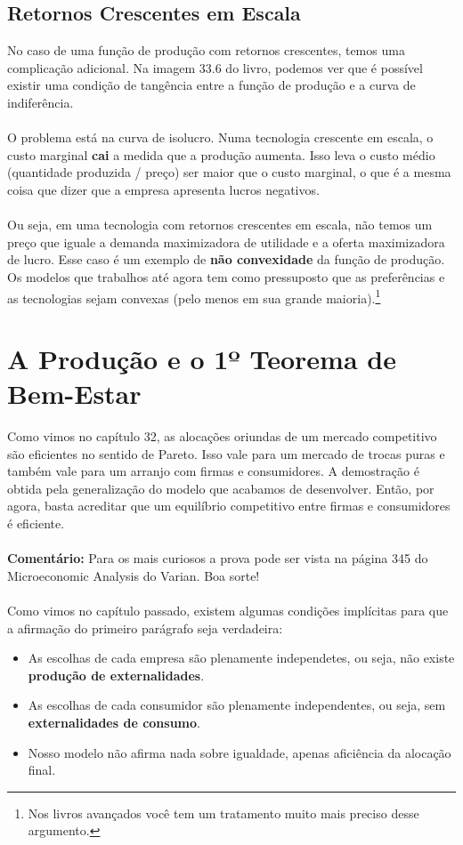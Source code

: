 \documentclass[a4paper,11pt,oneside]{book}
\theoremstyle{definition}
\theoremstyle{break}
\begin{document}
\subsection{Retornos Crescentes em Escala}

No caso de uma função de produção com retornos crescentes, temos uma complicação adicional. Na imagem 33.6 do livro, podemos ver que é possível existir uma condição de tangência entre a função de produção e a curva de indiferência.
\\~\\
O problema está na curva de isolucro. Numa tecnologia crescente em escala, o custo marginal \textbf{cai} a medida que a produção aumenta. Isso leva o custo médio (quantidade produzida / preço) ser maior que o custo marginal, o que é a mesma coisa que dizer que a empresa apresenta lucros negativos.
\\~\\
Ou seja, em uma tecnologia com retornos crescentes em escala, não temos um preço que iguale a demanda maximizadora de utilidade e a oferta maximizadora de lucro. Esse caso é um exemplo de \textbf{não convexidade} da função de produção. Os modelos que trabalhos até agora tem como pressuposto que as preferências e as tecnologias sejam convexas (pelo menos em sua grande maioria).\footnote{Nos livros avançados você tem um tratamento muito mais preciso desse argumento.} 

\section{A Produção e o 1º Teorema de Bem-Estar}

Como vimos no capítulo 32, as alocações oriundas de um mercado competitivo são eficientes no sentido de Pareto. Isso vale para um mercado de trocas puras e também vale para um arranjo com firmas e consumidores. A demostração é obtida pela generalização do modelo que acabamos de desenvolver. Então, por agora, basta acreditar que um equilíbrio competitivo entre firmas e consumidores é eficiente.
\\~\\
\textbf{Comentário:} Para os mais curiosos a prova pode ser vista na página 345 do Microeconomic Analysis do Varian. Boa sorte!
\\~\\
Como vimos no capítulo passado, existem algumas condições implícitas para que a afirmação do primeiro parágrafo seja verdadeira:
\begin{itemize}
	\item As escolhas de cada empresa são plenamente independetes, ou seja, não existe \textbf{produção de externalidades}.
	\item As escolhas de cada consumidor são plenamente independentes, ou seja, sem \textbf{externalidades de consumo}.
	\item Nosso modelo não afirma nada sobre igualdade, apenas aficiência da alocação final.
\end{itemize}
\end{document}
